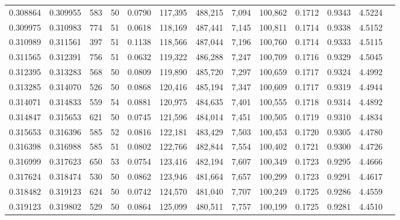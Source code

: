 \begin{tabular}{rrrrrrrrrrrrr}
0.308864 & 0.309955 &   583 &  50 &                                     0.0790 & 117,395 & 488,215 &   7,094 & 100,862 & 0.1712 & 0.9343 & 4.5224 \\
0.309975 & 0.310983 &   774 &  51 &                                     0.0618 & 118,169 & 487,441 &   7,145 & 100,811 & 0.1714 & 0.9338 & 4.5152 \\
0.310989 & 0.311561 &   397 &  51 &                                     0.1138 & 118,566 & 487,044 &   7,196 & 100,760 & 0.1714 & 0.9333 & 4.5115 \\
0.311565 & 0.312391 &   756 &  51 &                                     0.0632 & 119,322 & 486,288 &   7,247 & 100,709 & 0.1716 & 0.9329 & 4.5045 \\
0.312395 & 0.313283 &   568 &  50 &                                     0.0809 & 119,890 & 485,720 &   7,297 & 100,659 & 0.1717 & 0.9324 & 4.4992 \\
0.313285 & 0.314070 &   526 &  50 &                                     0.0868 & 120,416 & 485,194 &   7,347 & 100,609 & 0.1717 & 0.9319 & 4.4944 \\
0.314071 & 0.314833 &   559 &  54 &                                     0.0881 & 120,975 & 484,635 &   7,401 & 100,555 & 0.1718 & 0.9314 & 4.4892 \\
0.314847 & 0.315653 &   621 &  50 &                                     0.0745 & 121,596 & 484,014 &   7,451 & 100,505 & 0.1719 & 0.9310 & 4.4834 \\
0.315653 & 0.316396 &   585 &  52 &                                     0.0816 & 122,181 & 483,429 &   7,503 & 100,453 & 0.1720 & 0.9305 & 4.4780 \\
0.316398 & 0.316988 &   585 &  51 &                                     0.0802 & 122,766 & 482,844 &   7,554 & 100,402 & 0.1721 & 0.9300 & 4.4726 \\
0.316999 & 0.317623 &   650 &  53 &                                     0.0754 & 123,416 & 482,194 &   7,607 & 100,349 & 0.1723 & 0.9295 & 4.4666 \\
0.317624 & 0.318474 &   530 &  50 &                                     0.0862 & 123,946 & 481,664 &   7,657 & 100,299 & 0.1723 & 0.9291 & 4.4617 \\
0.318482 & 0.319123 &   624 &  50 &                                     0.0742 & 124,570 & 481,040 &   7,707 & 100,249 & 0.1725 & 0.9286 & 4.4559 \\
0.319123 & 0.319802 &   529 &  50 &                                     0.0864 & 125,099 & 480,511 &   7,757 & 100,199 & 0.1725 & 0.9281 & 4.4510 \\

\end{tabular}
